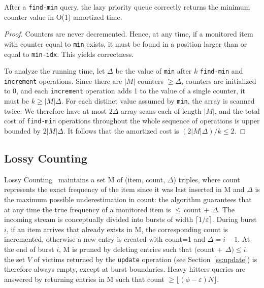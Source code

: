 \documentclass[preprint]{sigplanconf}
\begin{document}
\begin{lemma}
After a {\tt find-min} query, the lazy priority queue correctly returns the minimum counter value in O(1) amortized time.
\end{lemma}
\begin{proof}
Counters are never decremented. Hence, at any time, if a monitored item with counter equal to {\tt min} exists, it must be found in a position larger than or equal to {\tt min-idx}. This yields correctness.

To analyze the running time, let $\Delta$ be the value of {\tt min} after $k$ {\tt find-min} and {\tt increment} operations. Since there are $|M|$ counters $\ge\Delta$, counters are initialized to $0$, and each {\tt increment} operation adds 1 to the value of a single counter, it must be $k\ge |M|\Delta$. For each distinct value assumed by {\tt min}, the array is scanned twice. We therefore have at most $2\Delta$ array scans each of length $|M|$, and the total cost of {\tt find-min} operations throughout the whole sequence of operations is upper bounded by $2|M|\Delta$. It follows that the amortized cost is $(2|M|\Delta)/k\leq 2$.
\end{proof}


\subsection{Lossy Counting}
\label{ss:lc}

Lossy Counting~\cite{MM02} maintains a set M of (item, count, $\Delta$) triples, where count represents the exact frequency of the item since it was last inserted in M and $\Delta$ is the maximum possible underestimation in count: the algorithm guarantees that at any time the true frequency of a monitored item is $\leq\,$count$\,+\,\Delta$. The incoming stream  is conceptually divided into bursts of width $\lceil 1/\varepsilon\rceil$.  During burst $i$, if an item arrives that already exists in M, the corresponding count is incremented, otherwise a new entry is created with count=1 and $\Delta=i-1$. At the end of burst $i$, M is pruned by deleting entries such that $($count$\,+\,\Delta)\leq i$: the set $V$ of victims returned by the {\tt update} operation (see Section~\ref{ss:update}) is therefore always empty, except at burst boundaries. Heavy hitters queries are answered by returning entries in M such that count $\geq \lfloor(\phi-\varepsilon) N\rfloor$.

\end{document}
